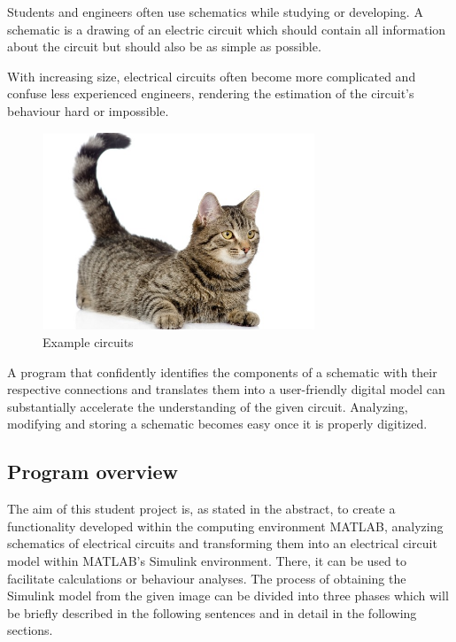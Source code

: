\documentclass[10pt,twocolumn,letterpaper]{article}
\begin{document}
Students and engineers often use schematics while studying or developing. A schematic is a drawing of an electric circuit which should contain all information about the circuit but should also be as simple as possible.
\par
With increasing size, electrical circuits often become more complicated and confuse less experienced engineers, rendering the estimation of the circuit's behaviour hard or impossible.
\par

\begin{figure}[!ht]
\includegraphics[width = 3.2in]{img/cat.jpg}
\caption{Example circuits}
\label{fig:c1}
\end{figure}

\par
A program that confidently identifies the components of a schematic with their respective connections and translates them into a user-friendly digital model can substantially accelerate the understanding of the given circuit. Analyzing, modifying and storing a schematic becomes easy once it is properly digitized.

\subsection{Program overview}
\label{subsec:over}

The aim of this student project is, as stated in the abstract, to create a functionality developed within the computing environment MATLAB, analyzing schematics of electrical circuits and transforming them into an electrical circuit model within MATLAB's Simulink environment. There, it can be used to facilitate calculations or behaviour analyses. The process of obtaining the Simulink model from the given image can be divided into three phases which will be briefly described in the following sentences and in detail in the following sections.
\par
\end{document}
